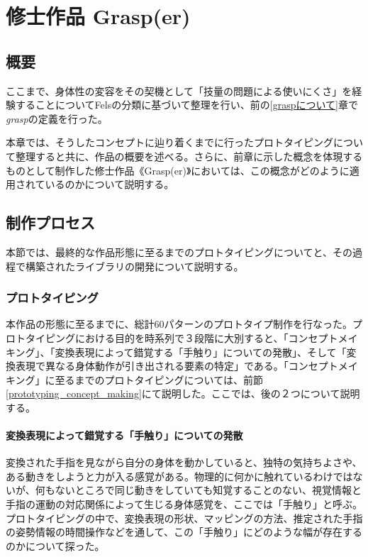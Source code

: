 \chapter{修士作品 Grasp(er)}
\section{概要}
ここまで、身体性の変容をその契機として「技量の問題による使いにくさ」を経験することについてFelsの分類に基づいて整理を行い、前の\ref{graspについて}章で\textit{grasp}の定義を行った。

本章では、そうしたコンセプトに辿り着くまでに行ったプロトタイピングについて整理すると共に、作品の概要を述べる。さらに、前章に示した概念を体現するものとして制作した修士作品《Grasp(er)》においては、この概念がどのように適用されているのかについて説明する。\\

\section{制作プロセス}
本節では、最終的な作品形態に至るまでのプロトタイピングについてと、その過程で構築されたライブラリの開発について説明する。
\subsection{プロトタイピング}
本作品の形態に至るまでに、総計60パターンのプロトタイプ制作を行なった。プロトタイピングにおける目的を時系列で３段階に大別すると、「コンセプトメイキング」、「変換表現によって錯覚する「手触り」についての発散」、そして「変換表現で異なる身体動作が引き出される要素の特定」である。「コンセプトメイキング」に至るまでのプロトタイピングについては、前節\ref{prototyping_concept_making}にて説明した。ここでは、後の２つについて説明する。

\subsubsection{変換表現によって錯覚する「手触り」についての発散}
変換された手指を見ながら自分の身体を動かしていると、独特の気持ちよさや、ある動きをしようと力が入る感覚がある。物理的に何かに触れているわけではないが、何もないところで同じ動きをしていても知覚することのない、視覚情報と手指の運動の対応関係によって生じる身体感覚を、ここでは「手触り」と呼ぶ。
プロトタイピングの中で、変換表現の形状、マッピングの方法、推定された手指の姿勢情報の時間操作などを通して、この「手触り」にどのような幅が存在するのかについて探った。
